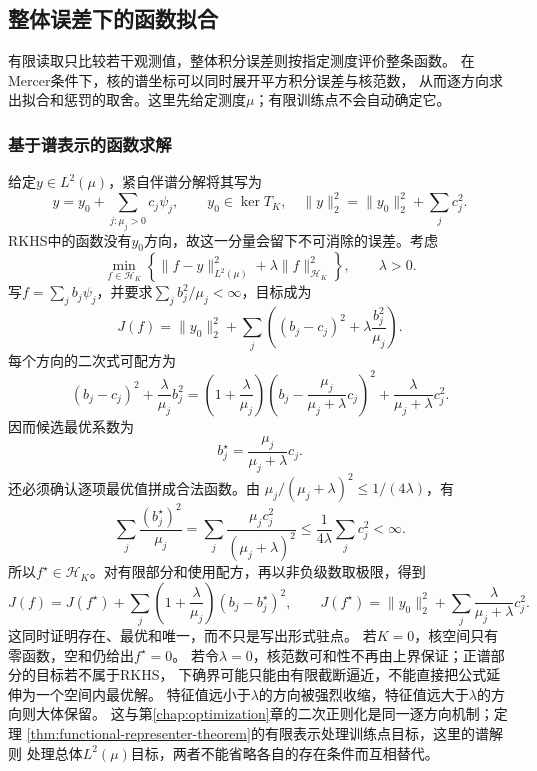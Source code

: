 \subsection{整体误差下的函数拟合}
\label{sec:functional-integral-error-fitting}

有限读取只比较若干观测值，整体积分误差则按指定测度评价整条函数。
在Mercer条件下，核的谱坐标可以同时展开平方积分误差与核范数，
从而逐方向求出拟合和惩罚的取舍。这里先给定测度$\mu$；有限训练点不会自动确定它。

\subsubsection{基于谱表示的函数求解}
\label{sec:functional-spectral-fitting-solvers}

给定$y\in L^2(\mu)$，紧自伴谱分解将其写为
\[
 y=y_0+\sum_{j:\mu_j>0}c_j\psi_j,\qquad
 y_0\in\ker T_K,\quad
 \lVert y\rVert_2^2=\lVert y_0\rVert_2^2+\sum_jc_j^2.
\]
RKHS中的函数没有$y_0$方向，故这一分量会留下不可消除的误差。考虑
\[
  \min_{f\in\mathcal{H}_K}
  \left\{
    \lVert f-y\rVert_{L^2(\mu)}^2
    +
    \lambda\lVert f\rVert_{\mathcal{H}_K}^2
  \right\},
  \qquad \lambda>0.
\]
写$f=\sum_jb_j\psi_j$，并要求$\sum_jb_j^2/\mu_j<\infty$，目标成为
\[
 J(f)=\lVert y_0\rVert_2^2+
 \sum_j\left((b_j-c_j)^2+\lambda\frac{b_j^2}{\mu_j}\right).
\]
每个方向的二次式可配方为
\[
 (b_j-c_j)^2+\frac{\lambda}{\mu_j}b_j^2
 =\left(1+\frac{\lambda}{\mu_j}\right)
   \left(b_j-\frac{\mu_j}{\mu_j+\lambda}c_j\right)^2
   +\frac{\lambda}{\mu_j+\lambda}c_j^2.
\]
因而候选最优系数为
\begin{equation}
  b_j^\star
  =
  \frac{\mu_j}{\mu_j+\lambda}c_j.
  \label{eq:functional-spectral-shrinkage}
\end{equation}
还必须确认逐项最优值拼成合法函数。由
$\mu_j/(\mu_j+\lambda)^2\leq1/(4\lambda)$，有
\[
 \sum_j\frac{(b_j^\star)^2}{\mu_j}
 =\sum_j\frac{\mu_j c_j^2}{(\mu_j+\lambda)^2}
 \leq\frac1{4\lambda}\sum_jc_j^2<\infty.
\]
所以$f^\star\in\mathcal H_K$。对有限部分和使用配方，再以非负级数取极限，得到
\[
 J(f)=J(f^\star)+
 \sum_j\left(1+\frac{\lambda}{\mu_j}\right)(b_j-b_j^\star)^2,\qquad
 J(f^\star)=\lVert y_0\rVert_2^2+
 \sum_j\frac{\lambda}{\mu_j+\lambda}c_j^2.
\]
这同时证明存在、最优和唯一，而不只是写出形式驻点。
若$K=0$，核空间只有零函数，空和仍给出$f^\star=0$。
若令$\lambda=0$，核范数可和性不再由上界保证；正谱部分的目标若不属于RKHS，
下确界可能只能由有限截断逼近，不能直接把公式延伸为一个空间内最优解。
特征值远小于$\lambda$的方向被强烈收缩，特征值远大于$\lambda$的方向则大体保留。
这与第\ref{chap:optimization}章的二次正则化是同一逐方向机制；定理
\ref{thm:functional-representer-theorem}的有限表示处理训练点目标，这里的谱解则
处理总体$L^2(\mu)$目标，两者不能省略各自的存在条件而互相替代。

